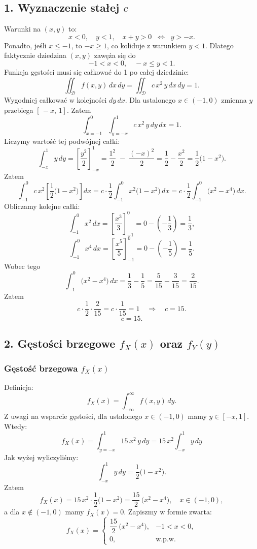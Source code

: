 \documentclass[polish, 8pt]{article}
\begin{document}
\subsection*{1. Wyznaczenie stałej \(c\)}
Warunki na \((x,y)\) to:
\[
x < 0,\quad y < 1,\quad x + y > 0 \;\;\Longleftrightarrow\;\; y > -x.
\]
Ponadto, jeśli \(x \le -1\), to \(-x \ge 1\), co koliduje z warunkiem \(y < 1\). 
Dlatego faktycznie dziedzina \((x,y)\) zawęża się do
\[
-1 < x < 0, 
\quad -x \le y < 1.
\]
Funkcja gęstości musi się całkować do 1 po całej dziedzinie:
\[
\iint_{\mathcal{D}} f(x,y)\,dx\,dy 
=\iint_{\mathcal{D}} c\,x^2\,y \,dx\,dy = 1.
\]
Wygodniej całkować w kolejności \(dy\,dx\). Dla ustalonego \(x\in(-1,0)\) zmienna \(y\) przebiega \([\,-x,\,1]\). Zatem
\[
\int_{x=-1}^{0} \int_{y=-x}^{1} c \, x^2\,y \,dy\,dx = 1.
\]
Liczymy wartość tej podwójnej całki:
\[
\int_{-x}^{1} y \,dy 
= \left[ \frac{y^2}{2} \right]_{-x}^{1}
= \frac{1^2}{2} \;-\; \frac{(-x)^2}{2}
= \frac12 - \frac{x^2}{2}
= \frac12\bigl(1 - x^2\bigr).
\]
Zatem
\[
\int_{-1}^{0} c\,x^2 \left[\frac12\bigl(1 - x^2\bigr)\right] dx 
= c \cdot \frac12 \int_{-1}^{0} x^2 \bigl(1 - x^2\bigr)\,dx 
= c \cdot \frac12 \int_{-1}^{0} \bigl(x^2 - x^4\bigr)\,dx.
\]
Obliczamy kolejne całki:
\[
\int_{-1}^{0} x^2 \,dx = \left[\frac{x^3}{3}\right]_{-1}^{0} = 0 - \left(-\frac{1}{3}\right) = \frac{1}{3},
\]
\[
\int_{-1}^{0} x^4 \,dx = \left[\frac{x^5}{5}\right]_{-1}^{0} = 0 - \left(-\frac{1}{5}\right) = \frac{1}{5}.
\]
Wobec tego
\[
\int_{-1}^{0} \bigl(x^2 - x^4\bigr)\,dx 
= \frac{1}{3} - \frac{1}{5}
= \frac{5}{15} - \frac{3}{15}
= \frac{2}{15}.
\]
Zatem
\[
c \cdot \frac12 \cdot \frac{2}{15} = c \cdot \frac{1}{15} = 1
\quad\Longrightarrow\quad
c = 15.
\]
\[
\boxed{ c = 15. }
\]

\subsection*{2. Gęstości brzegowe \(f_X(x)\) oraz \(f_Y(y)\)}

\subsubsection*{Gęstość brzegowa \(f_X(x)\)}
Definicja:
\[
f_X(x) = \int_{-\infty}^{\infty} f(x,y)\,dy.
\]
Z uwagi na wsparcie gęstości, dla ustalonego \(x\in(-1,0)\) mamy \(y \in [-x,1]\). Wtedy:
\[
f_X(x) 
= \int_{y=-x}^{1} 15\,x^2\,y \,dy
= 15\,x^2 \int_{-x}^{1} y\,dy
\]
Jak wyżej wyliczyliśmy:
\[
\int_{-x}^{1} y\,dy 
= \frac12 \bigl(1 - x^2\bigr).
\]
Zatem
\[
f_X(x) = 15\,x^2 \cdot \frac12 \bigl(1 - x^2\bigr)
= \frac{15}{2}\,\bigl(x^2 - x^4\bigr),
\quad x\in(-1,0),
\]
a dla \(x\notin(-1,0)\) mamy \(f_X(x)=0\).  
Zapiszmy w formie zwarta:
\[
\boxed{
f_X(x) 
= \begin{cases}
\dfrac{15}{2}\,\bigl(x^2 - x^4\bigr), & -1 < x < 0,\\
0, & \text{w.p.w.}
\end{cases}
}
\]
\end{document}
